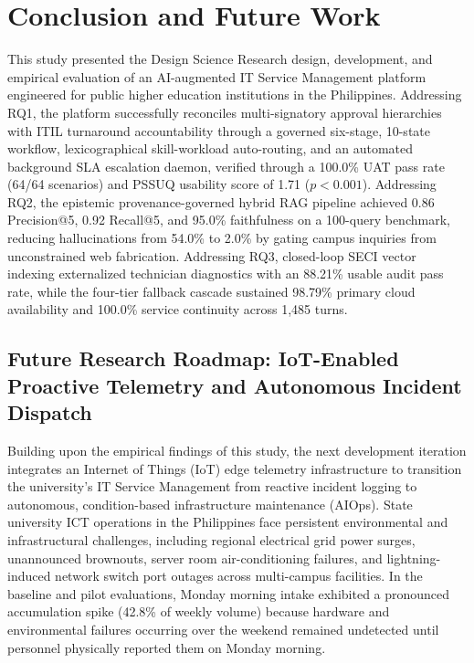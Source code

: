 \documentclass[conference]{IEEEtran}
\begin{document}
\section{Conclusion and Future Work}
This study presented the Design Science Research design, development, and empirical evaluation of an AI-augmented IT Service Management platform engineered for public higher education institutions in the Philippines. Addressing RQ1, the platform successfully reconciles multi-signatory approval hierarchies with ITIL turnaround accountability through a governed six-stage, 10-state workflow, lexicographical skill-workload auto-routing, and an automated background SLA escalation daemon, verified through a 100.0\% UAT pass rate (64/64 scenarios) and PSSUQ usability score of 1.71 ($p < 0.001$). Addressing RQ2, the epistemic provenance-governed hybrid RAG pipeline achieved 0.86 Precision@5, 0.92 Recall@5, and 95.0\% faithfulness on a 100-query benchmark, reducing hallucinations from 54.0\% to 2.0\% by gating campus inquiries from unconstrained web fabrication. Addressing RQ3, closed-loop SECI vector indexing externalized technician diagnostics with an 88.21\% usable audit pass rate, while the four-tier fallback cascade sustained 98.79\% primary cloud availability and 100.0\% service continuity across 1,485 turns.

\subsection{Future Research Roadmap: IoT-Enabled Proactive Telemetry and Autonomous Incident Dispatch}
Building upon the empirical findings of this study, the next development iteration integrates an Internet of Things (IoT) edge telemetry infrastructure to transition the university's IT Service Management from reactive incident logging to autonomous, condition-based infrastructure maintenance (AIOps). State university ICT operations in the Philippines face persistent environmental and infrastructural challenges, including regional electrical grid power surges, unannounced brownouts, server room air-conditioning failures, and lightning-induced network switch port outages across multi-campus facilities. In the baseline and pilot evaluations, Monday morning intake exhibited a pronounced accumulation spike (42.8\% of weekly volume) because hardware and environmental failures occurring over the weekend remained undetected until personnel physically reported them on Monday morning.
\end{document}
